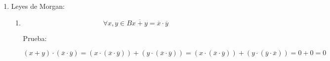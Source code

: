 \documentclass[
]{article}
\begin{document}
\begin{enumerate}
\begin{enumerate}
\begin{enumerate}
\begin{enumerate}
\begin{enumerate}
          \[\mathit{De}{\lbrack\mathbf{1}\rbrack}y\mathit{de}{\lbrack\mathbf{2}\rbrack}\mathit{obtenemos}:\]

          \[{1 = {\overline{x} + {({x + y})}}} = {{({\overline{x} + x})} + y}\]
        \item
          \[{0 = {\overline{x} \cdot {({x \cdot y})}}} = {{({\overline{x} \cdot x})} \cdot y}\]

          Prueba:

          \[{\lbrack\mathbf{A}\rbrack}{{{{({\overline{x} \cdot {({x \cdot y})}})} + x} = {x \cdot {({x + y})}}} = x}\]

          \[{\lbrack\mathbf{B}\rbrack}{{{{({\overline{x} \cdot {({x \cdot y})}})} + \overline{x}} = {\overline{x} \cdot {({x + y})}}} = \overline{x}}\]

          \[\mathit{De}{\lbrack\mathbf{A}\rbrack}y\mathit{de}{\lbrack\mathbf{B}\rbrack}\mathit{obtenemos}{\lbrack\mathbf{1}\rbrack}:\]

          \[{\lbrack\mathbf{1}\rbrack}{{{0 = {x \cdot \overline{x}}} = {{({{({\overline{x} \cdot {({x \cdot y})}})} + x})} \cdot {({{({\overline{x} \cdot {({x \cdot y})}})} \cdot \overline{x}})}}} =}\]

          \[{{= {{({\overline{x} \cdot {({x \cdot y})}})} + {({x \cdot \overline{x}})}}} = {{({\overline{x} \cdot {({x \cdot y})}})} + 0}} = {\overline{x} \cdot {({x \cdot y})}}\]

          \[{\lbrack\mathbf{2}\rbrack}{{0 = {0 \cdot y}} = {{({\overline{x} \cdot x})} \cdot y}}\]

          \[\mathit{De}{\lbrack\mathbf{1}\rbrack}y\mathit{de}{\lbrack\mathbf{2}\rbrack}\mathit{obtenemos}:\]

          \[{0 = {\overline{x} \cdot {({x \cdot y})}}} = {{({\overline{x} \cdot x})} \cdot y}\]
        \end{enumerate}
      \end{enumerate}
    \item
      Leyes de Morgan:

      \begin{enumerate}
      \def\labelenumiv{\arabic{enumiv}.}
      \item
        \[\forall x,{y \in B}{\overline{x+y} = {\overline{x} \cdot \overline{y}}}\]

        Prueba:

        \[{{{{{({x + y})} \cdot {({\overline{x} \cdot \overline{y}})}} = {{({x \cdot {({\overline{x} \cdot \overline{y}})}})} + {({y \cdot {({\overline{x} \cdot \overline{y}})}})}}} = {{({x \cdot {({\overline{x} \cdot \overline{y}})}})} + {({y \cdot {({\overline{y} \cdot \overline{x}})}})}}} = {0 + 0}} = 0\]


\end{enumerate}
\end{enumerate}
\end{enumerate}
\end{enumerate}
\end{document}
